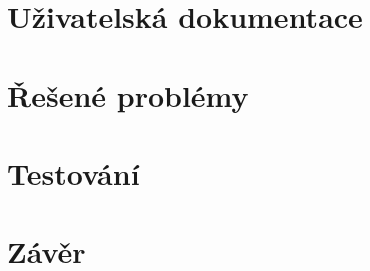 \documentclass[12pt, a4paper]{article}
\begin{document}
	\section{Uživatelská dokumentace}
	
	\section{Řešené problémy}
	
	\section{Testování}
	
	\section{Závěr}
	
	
	\newpage
	\begin{thebibliography}{9}
		
	\end{thebibliography}
	
\end{document}
